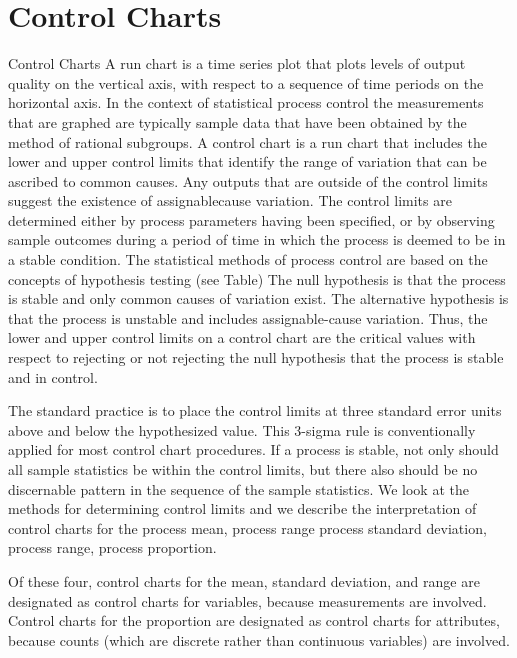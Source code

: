 \documentclass[]{report}
\begin{document}
\section{Control Charts}
Control Charts
A run chart is a time series plot that plots levels of output quality on the vertical axis,
with respect to a sequence of time periods on the horizontal axis. In the context of
statistical process control the measurements that are graphed are typically sample
data that have been obtained by the method of rational subgroups.
A control chart is a run chart that includes the lower and upper control limits that
identify the range of variation that can be ascribed to common causes.
Any outputs that are outside of the control limits suggest the existence of assignablecause
variation.
The control limits are determined either by process parameters having been
specified, or by observing sample outcomes during a period of time in which the
process is deemed to be in a stable condition.
The statistical methods of process control are based on the concepts of hypothesis
testing (see Table)
The null hypothesis is that the process is stable and only common causes of
variation exist.
The alternative hypothesis is that the process is unstable and includes
assignable-cause variation.
Thus, the lower and upper control limits on a control chart are the critical values with
respect to rejecting or not rejecting the null hypothesis that the process is stable and
in control.

The standard practice is to place the control limits at three standard error units above
and below the hypothesized value. This 3-sigma rule is conventionally applied for
most control chart procedures.
If a process is stable, not only should all sample statistics be within the control limits,
but there also should be no discernable pattern in the sequence of the sample
statistics.
We look at the methods for determining control limits and we describe the
interpretation of control charts for the 
process mean,
process range
process standard deviation,
process range, process proportion.

Of these four, control charts for the mean, standard deviation, and range are designated as control charts for variables, because measurements are involved.
Control charts for the proportion are designated as control charts for attributes,
because counts (which are discrete rather than continuous variables) are involved.

{
	\large
}
\end{document}
